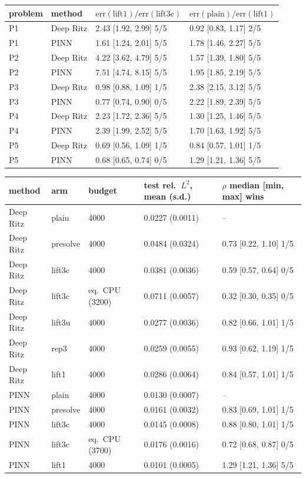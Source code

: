 \begin{tabular}{llll}
\hline
problem & method & $\mathrm{err(lift1)}/\mathrm{err(lift3c)}$ & $\mathrm{err(plain)}/\mathrm{err(lift1)}$ \\
\hline
P1 & Deep Ritz & 2.43 [1.92, 2.99] 5/5 & 0.92 [0.83, 1.17] 2/5 \\
P1 & PINN & 1.61 [1.24, 2.01] 5/5 & 1.78 [1.46, 2.27] 5/5 \\
P2 & Deep Ritz & 4.22 [3.62, 4.79] 5/5 & 1.57 [1.39, 1.80] 5/5 \\
P2 & PINN & 7.51 [4.74, 8.15] 5/5 & 1.95 [1.85, 2.19] 5/5 \\
P3 & Deep Ritz & 0.98 [0.88, 1.09] 1/5 & 2.38 [2.15, 3.12] 5/5 \\
P3 & PINN & 0.77 [0.74, 0.90] 0/5 & 2.22 [1.89, 2.39] 5/5 \\
P4 & Deep Ritz & 2.23 [1.72, 2.36] 5/5 & 1.30 [1.25, 1.46] 5/5 \\
P4 & PINN & 2.39 [1.99, 2.52] 5/5 & 1.70 [1.63, 1.92] 5/5 \\
P5 & Deep Ritz & 0.69 [0.56, 1.09] 1/5 & 0.84 [0.57, 1.01] 1/5 \\
P5 & PINN & 0.68 [0.65, 0.74] 0/5 & 1.29 [1.21, 1.36] 5/5 \\
\hline
\end{tabular}

\begin{tabular}{lllll}
\hline
method & arm & budget & test rel.\ $L^2$, mean (s.d.) & $\rho$ median [min, max] wins \\
\hline
Deep Ritz & plain & 4000 & 0.0227 (0.0011) & -- \\
Deep Ritz & presolve & 4000 & 0.0484 (0.0324) & 0.73 [0.22, 1.10] 1/5 \\
Deep Ritz & lift3c & 4000 & 0.0381 (0.0036) & 0.59 [0.57, 0.64] 0/5 \\
Deep Ritz & lift3c & eq.\ CPU (3200) & 0.0711 (0.0057) & 0.32 [0.30, 0.35] 0/5 \\
Deep Ritz & lift3u & 4000 & 0.0277 (0.0036) & 0.82 [0.66, 1.01] 1/5 \\
Deep Ritz & rep3 & 4000 & 0.0259 (0.0055) & 0.93 [0.62, 1.19] 1/5 \\
Deep Ritz & lift1 & 4000 & 0.0286 (0.0064) & 0.84 [0.57, 1.01] 1/5 \\
PINN & plain & 4000 & 0.0130 (0.0007) & -- \\
PINN & presolve & 4000 & 0.0161 (0.0032) & 0.83 [0.69, 1.01] 1/5 \\
PINN & lift3c & 4000 & 0.0145 (0.0008) & 0.88 [0.80, 1.01] 1/5 \\
PINN & lift3c & eq.\ CPU (3700) & 0.0176 (0.0016) & 0.72 [0.68, 0.87] 0/5 \\
PINN & lift1 & 4000 & 0.0101 (0.0005) & 1.29 [1.21, 1.36] 5/5 \\
\hline
\end{tabular}
